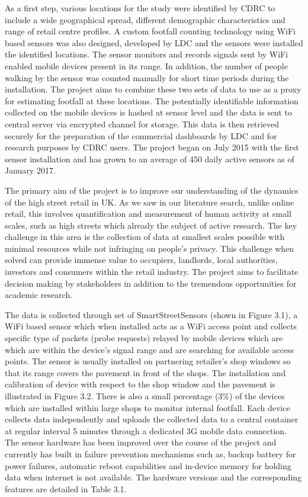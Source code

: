 As a first step, various locations for the study were identified by CDRC to include a wide geographical spread, different demographic characteristics and range of retail centre profiles.
A custom footfall counting technology using WiFi based sensors was also designed, developed by LDC and the sensors were installed the identified locations.
The sensor monitors and records signals sent by WiFi enabled mobile devices present in its range.
In addition, the number of people walking by the sensor was counted manually for short time periods during the installation.
The project aims to combine these two sets of data to use as a proxy for estimating footfall at these locations.
The potentially identifiable information collected on the mobile devices is hashed at sensor level and the data is sent to central server via encrypted channel for storage.
This data is then retrieved securely for the preparation of the commercial dashboards by LDC and for research purposes by CDRC users.
The project began on July 2015 with the first sensor installation and has grown to an average of 450 daily active sensors as of January 2017.

The primary aim of the project is to improve our understanding of the dynamics of the high street retail in UK.
As we saw in our literature search, unlike online retail, this involves quantification and measurement of human activity at small scales, such as high streets which already the subject of active research.
The key challenge in this area is the collection of data at smallest scales possible with minimal resources while not infringing on people’s privacy.
This challenge when solved can provide immense value to occupiers, landlords, local authorities, investors and consumers within the retail industry.
The project aims to facilitate decision making by stakeholders in addition to the tremendous opportunities for academic research.

The data is collected through set of SmartStreetSensors (shown in Figure 3.1), a WiFi based sensor which when installed acts as a WiFi access point and collects specific type of packets (probe requests) relayed by mobile devices which are which are within the device’s signal range and are searching for available access points.
The sensor is usually installed on partnering retailer's shop windows so that its range covers the pavement in front of the shops.
The installation and calibration of device with respect to the shop window and the pavement is illustrated in Figure 3.2.
There is also a small percentage (3\%) of the devices which are installed within large shops to monitor internal footfall.
Each device collects data independently and uploads the collected data to a central container at regular interval 5 minutes through a dedicated 3G mobile data connection.
The sensor hardware has been improved over the course of the project and currently has built in failure prevention mechanisms such as, backup battery for power failures, automatic reboot capabilities and in-device memory for holding data when internet is not available.
The hardware versions and the corresponding features are detailed in Table 3.1.

